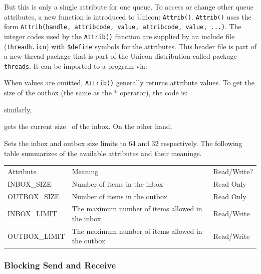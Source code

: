 
But this is only a single attribute for one queue. To access or change
other queue attributes, a new function is introduced to Unicon:
\texttt{Attrib()}. \texttt{Attrib()}
uses the form \texttt{Attrib(handle, attribcode, value,
attribcode, value, ...)}. The integer codes used by the
\texttt{Attrib()} function are supplied by an include
file (\texttt{threadh.icn}) with
\texttt{\$define} symbols for the attributes. This
header file is part of a new thread package that is part of the Unicon
distribution called package \texttt{threads}. It can be
imported to a program via:


When values are omitted, \texttt{Attrib()} generally
returns attribute values. To get the size of the outbox (the same as
the * operator), the code is:


\noindent similarly, 


gets the current size \ of the inbox. On the other hand, 


Sets the inbox and outbox size limits to 64 and 32 respectively. The
following table summarizes of the available attributes and their
meanings.


\bigskip

\begin{flushleft}
\tablehead{}
\begin{supertabular}{m{2.0941598in}m{1.9087598in}m{1.9108598in}}
Attribute &
Meaning &
Read/Write?\\
INBOX\_SIZE &
Number of items in the inbox &
Read Only\\
OUTBOX\_SIZE &
Number of items in the outbox &
Read Only\\
INBOX\_LIMIT &
The maximum number of items allowed in the inbox &
Read/Write\\
OUTBOX\_LIMIT &
The maximum number of items allowed in the outbox &
Read/Write\\
\end{supertabular}
\end{flushleft}

\bigskip


\bigskip

\subsubsection{Blocking Send and Receive}

